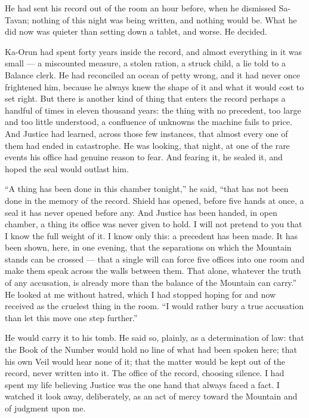 He had sent his record out of the room an hour before, when he dismissed Sa-Tavan; nothing of this night was being written, and nothing would be. What he did now was quieter than setting down a tablet, and worse. He decided.\par
 
Ka-Orun had spent forty years inside the record, and almost everything in it was small --- a miscounted measure, a stolen ration, a struck child, a lie told to a Balance clerk. He had reconciled an ocean of petty wrong, and it had never once frightened him, because he always knew the shape of it and what it would cost to set right. But there is another kind of thing that enters the record perhaps a handful of times in eleven thousand years: the thing with no precedent, too large and too little understood, a confluence of unknowns the machine fails to price. And Justice had learned, across those few instances, that almost every one of them had ended in catastrophe. He was looking, that night, at one of the rare events his office had genuine reason to fear. And fearing it, he sealed it, and hoped the seal would outlast him.\par
 
``A thing has been done in this chamber tonight,'' he said, ``that has not been done in the memory of the record. Shield has opened, before five hands at once, a seal it has never opened before any. And Justice has been handed, in open chamber, a thing its office was never given to hold. I will not pretend to you that I know the full weight of it. I know only this: a precedent has been made. It has been shown, here, in one evening, that the separations on which the Mountain stands can be crossed --- that a single will can force five offices into one room and make them speak across the walls between them. That alone, whatever the truth of any accusation, is already more than the balance of the Mountain can carry.'' He looked at me without hatred, which I had stopped hoping for and now received as the cruelest thing in the room. ``I would rather bury a true accusation than let this move one step further.''\par
 
He would carry it to his tomb. He said so, plainly, as a determination of law: that the Book of the Number would hold no line of what had been spoken here; that his own Veil would hear none of it; that the matter would be kept out of the record, never written into it. The office of the record, choosing silence. I had spent my life believing Justice was the one hand that always faced a fact. I watched it look away, deliberately, as an act of mercy toward the Mountain and of judgment upon me.\par
 
